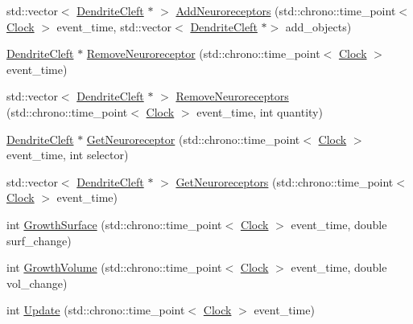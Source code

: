 \begin{DoxyCompactItemize}
\item 
std\+::vector$<$ \mbox{\hyperlink{classDendriteCleft}{Dendrite\+Cleft}} $\ast$ $>$ \mbox{\hyperlink{classDendriteCleft_a6d29f577ff12366f8f51804b13468395}{Add\+Neuroreceptors}} (std\+::chrono\+::time\+\_\+point$<$ \mbox{\hyperlink{universe_8h_a0ef8d951d1ca5ab3cfaf7ab4c7a6fd80}{Clock}} $>$ event\+\_\+time, std\+::vector$<$ \mbox{\hyperlink{classDendriteCleft}{Dendrite\+Cleft}} $\ast$$>$ add\+\_\+objects)
\item 
\mbox{\hyperlink{classDendriteCleft}{Dendrite\+Cleft}} $\ast$ \mbox{\hyperlink{classDendriteCleft_afaf06d4516355dfe2e0e4c33a00f0f1d}{Remove\+Neuroreceptor}} (std\+::chrono\+::time\+\_\+point$<$ \mbox{\hyperlink{universe_8h_a0ef8d951d1ca5ab3cfaf7ab4c7a6fd80}{Clock}} $>$ event\+\_\+time)
\item 
std\+::vector$<$ \mbox{\hyperlink{classDendriteCleft}{Dendrite\+Cleft}} $\ast$ $>$ \mbox{\hyperlink{classDendriteCleft_ac29b12d4abcc47fa298ab9e95f578f0e}{Remove\+Neuroreceptors}} (std\+::chrono\+::time\+\_\+point$<$ \mbox{\hyperlink{universe_8h_a0ef8d951d1ca5ab3cfaf7ab4c7a6fd80}{Clock}} $>$ event\+\_\+time, int quantity)
\item 
\mbox{\hyperlink{classDendriteCleft}{Dendrite\+Cleft}} $\ast$ \mbox{\hyperlink{classDendriteCleft_a5eb3a8f143f63b852b8f5e245d385519}{Get\+Neuroreceptor}} (std\+::chrono\+::time\+\_\+point$<$ \mbox{\hyperlink{universe_8h_a0ef8d951d1ca5ab3cfaf7ab4c7a6fd80}{Clock}} $>$ event\+\_\+time, int selector)
\item 
std\+::vector$<$ \mbox{\hyperlink{classDendriteCleft}{Dendrite\+Cleft}} $\ast$ $>$ \mbox{\hyperlink{classDendriteCleft_a4a14361574777fb1d66fd4ed2d4f2492}{Get\+Neuroreceptors}} (std\+::chrono\+::time\+\_\+point$<$ \mbox{\hyperlink{universe_8h_a0ef8d951d1ca5ab3cfaf7ab4c7a6fd80}{Clock}} $>$ event\+\_\+time)
\item 
int \mbox{\hyperlink{classDendriteCleft_af4715ffbf1bf437523d07e37b7abc3e0}{Growth\+Surface}} (std\+::chrono\+::time\+\_\+point$<$ \mbox{\hyperlink{universe_8h_a0ef8d951d1ca5ab3cfaf7ab4c7a6fd80}{Clock}} $>$ event\+\_\+time, double surf\+\_\+change)
\item 
int \mbox{\hyperlink{classDendriteCleft_a0cb2fc6ad72bba55b5f65130006d4b12}{Growth\+Volume}} (std\+::chrono\+::time\+\_\+point$<$ \mbox{\hyperlink{universe_8h_a0ef8d951d1ca5ab3cfaf7ab4c7a6fd80}{Clock}} $>$ event\+\_\+time, double vol\+\_\+change)
\item 
int \mbox{\hyperlink{classDendriteCleft_a3a75af4d6fd97c9635134509f170a04e}{Update}} (std\+::chrono\+::time\+\_\+point$<$ \mbox{\hyperlink{universe_8h_a0ef8d951d1ca5ab3cfaf7ab4c7a6fd80}{Clock}} $>$ event\+\_\+time)
\end{DoxyCompactItemize}
